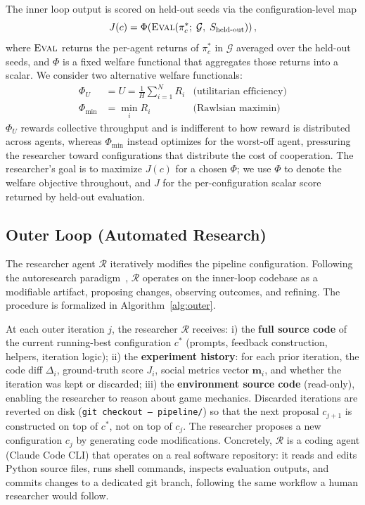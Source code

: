 \documentclass{article}
\newcommand{\cR}{\mathcal{R}}
\newcommand{\cG}{\mathcal{G}}
\newcommand{\bm}{\mathbf{m}}
\begin{document}
The inner loop output is scored on held-out seeds via the configuration-level map
\begin{equation}
  J(c) = \Phi\!\left(\textsc{Eval}(\pi^*_c;\; \cG,\; S_{\text{held-out}})\right),
  \label{eq:J}
\end{equation}
where $\textsc{Eval}$ returns the per-agent returns of $\pi^*_c$ in $\cG$ averaged over the held-out seeds, and $\Phi$ is a fixed welfare functional that aggregates those returns into a scalar. We consider two alternative welfare functionals:
\begin{align}
  \Phi_U &= U = \frac{1}{H}\sum_{i=1}^{N} R_i & \text{(utilitarian efficiency)} \label{eq:eff}\\
  \Phi_{\min} &= \min_i R_i & \text{(Rawlsian maximin)} \label{eq:rawls}
\end{align}
$\Phi_U$ rewards collective throughput and is indifferent to how reward is distributed across agents, whereas $\Phi_{\min}$ instead optimizes for the worst-off agent, pressuring the researcher toward configurations that distribute the cost of cooperation. The researcher's goal is to maximize $J(c)$ for a chosen $\Phi$; we use $\Phi$ to denote the welfare objective throughout, and $J$ for the per-configuration scalar score returned by held-out evaluation.

\subsection{Outer Loop (Automated Research)}

The researcher agent $\cR$ iteratively modifies the pipeline configuration. Following the autoresearch paradigm~\cite{karpathy2026}, $\cR$ operates on the inner-loop codebase as a modifiable artifact, proposing changes, observing outcomes, and refining. The procedure is formalized in Algorithm~\ref{alg:outer}.

At each outer iteration $j$, the researcher $\cR$ receives: i) the \textbf{full source code} of the current running-best configuration $c^*$ (prompts, feedback construction, helpers, iteration logic); ii) the \textbf{experiment history}: for each prior iteration, the code diff $\Delta_i$, ground-truth score $J_i$, social metrics vector $\bm_i$, and whether the iteration was kept or discarded; iii) the \textbf{environment source code} (read-only), enabling the researcher to reason about game mechanics. Discarded iterations are reverted on disk (\texttt{git checkout -- pipeline/}) so that the next proposal $c_{j+1}$ is constructed on top of $c^*$, not on top of $c_j$.
The researcher proposes a new configuration $c_j$ by generating code modifications. Concretely, $\cR$ is a coding agent (Claude Code CLI) that operates on a real software repository: it reads and edits Python source files, runs shell commands, inspects evaluation outputs, and commits changes to a dedicated git branch, following the same workflow a human researcher would follow.
\end{document}
